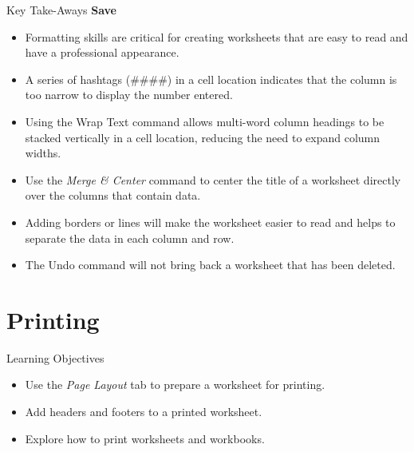 \begin{center}
	\begin{tkwbox}{Key Take-Aways}
		\textbf{Save}
		\\
		\begin{itemize}
			\setlength{\itemsep}{0pt}
			\setlength{\parskip}{0pt}
			\setlength{\parsep}{0pt}
			
			\item Formatting skills are critical for creating worksheets that are easy to read and have a professional appearance.
			\item A series of hashtags (\#\#\#\#) in a cell location indicates that the column is too narrow to display the number entered.
			\item Using the Wrap Text command allows multi-word column headings to be stacked vertically in a cell location, reducing the need to expand column widths.
			\item Use the \textit{Merge \& Center} command to center the title of a worksheet directly over the columns that contain data.
			\item Adding borders or lines will make the worksheet easier to read and helps to separate the data in each column and row.
			\item The Undo command will not bring back a worksheet that has been deleted.
		
		\end{itemize}
	\end{tkwbox}
\end{center}

\section{Printing}

\begin{center}
	\begin{objbox}{Learning Objectives}
		\begin{itemize}
			\setlength{\itemsep}{0pt}
			\setlength{\parskip}{0pt}
			\setlength{\parsep}{0pt}
			
			\item Use the \textit{Page Layout} tab to prepare a worksheet for printing.
			\item Add headers and footers to a printed worksheet.
			\item Explore how to print worksheets and workbooks.
		\end{itemize}
	\end{objbox}
\end{center}

